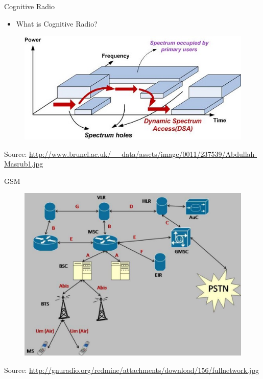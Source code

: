 \documentclass{beamer}
\begin{document}
  \begin{frame}{Cognitive Radio}
    \begin{minipage}[t][0.8\textheight][t]{\textwidth}
      \begin{itemize}
        \item What is Cognitive Radio?
      \end{itemize}
      \begin{figure}
        \centering
        \includegraphics[width=\linewidth]{img/freqUtil}
      \end{figure}
      \vfill
      \tiny{Source: \url{http://www.brunel.ac.uk/\_\_data/assets/image/0011/237539/Abdullah-Masrub1.jpg}}
    \end{minipage}
  \end{frame}

   \begin{frame}{GSM}
    \begin{minipage}[t][0.8\textheight][t]{\textwidth}
      \begin{figure}
        \centering
        \includegraphics[width=0.8\linewidth]{img/gsmNetwork}
      \end{figure}
      \vfill
      \tiny{Source: \url{http://gnuradio.org/redmine/attachments/download/156/fullnetwork.jpg}}
    \end{minipage}
  \end{frame}
 
\end{document}
